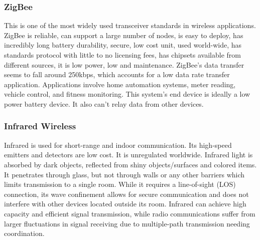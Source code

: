 \documentclass[12pt]{article}
\begin{document}
\subsubsection{ZigBee} 
This is one of the most widely used transceiver standards in wireless applications. ZigBee is reliable, can support a large number of nodes, is easy to deploy, has incredibly long battery durability, secure, low cost unit, used world-wide, has standards protocol with little to no licensing fees, has chipsets available from different sources, it is low power, low and maintenance. ZigBee’s data transfer seems to fall around 250kbps, which accounts for a low data rate transfer application. Applications involve home automation systems, meter reading, vehicle control, and fitness monitoring. This system’s end device is ideally a low power battery device. It also can’t relay data from other devices. \cite{zigbee}\\

\subsubsection{Infrared Wireless} 
Infrared is used for short-range and indoor communication. Its high-speed emitters and detectors are low cost. It is unregulated worldwide. Infrared light is absorbed by dark objects, reflected from shiny objects/surfaces and colored items. It penetrates through glass, but not through walls or any other barriers which limits transmission to a single room. While it requires a line-of-sight (LOS) connection, its wave confinement allows for secure communication and does not interfere with other devices located outside its room. Infrared can achieve high capacity and efficient signal transmission, while radio communications suffer from larger fluctuations in signal receiving due to multiple-path transmission needing coordination. \cite{infrared}\\
\end{document}
